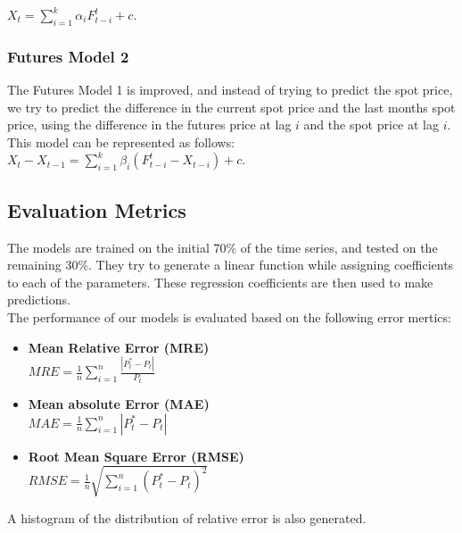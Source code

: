 \documentclass[runningheads]{llncs}
\begin{document}
$X_t = \sum\limits_{i=1}^k \alpha_{i}F_{t-i}^t + c$.\\

\subsubsection{Futures Model 2}
\noindent The Futures Model 1 is improved, and instead of trying to predict the spot price, we try to predict the difference in the current spot price and the last months spot price, using the difference in the futures price at lag $i$ and the spot price at lag $i$. This model can be represented as follows:\\

$X_t - X_{t-1} = \sum\limits_{i=1}^k \beta_i(F_{t-i}^t - X_{t-i}) +c$.


\subsection{Evaluation Metrics}

\noindent The models are trained on the initial 70\% of the time series, and tested on the remaining 30\%. They try to generate a linear function while assigning coefficients to each of the parameters. These regression coefficients are then used to make predictions. \\

The performance of our models is evaluated based on the following error mertics:

\begin {itemize}

\item \textbf{Mean Relative Error (MRE)}\\
$MRE = \frac{1}{n}\sum\limits_{i=1}^n \frac{|P^*_{t} - P_{t}|}{P_t}$\\

\item \textbf{Mean absolute Error (MAE)}\\
$MAE = \frac{1}{n}\sum\limits_{i=1}^n |P^*_{t} - P_{t}|$\\

\item \textbf{Root Mean Square Error (RMSE)}\\
$RMSE = \frac{1}{n}\sqrt{\sum\limits_{i=1}^n (P^*_{t} - P_{t})^2}$\\

\end {itemize}

A histogram of the distribution of relative error is also generated.
\end{document}
